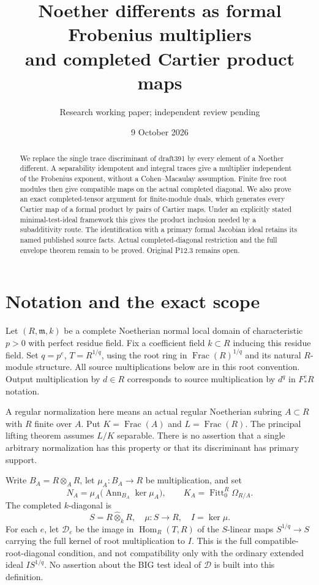 \documentclass[11pt]{article}
\title{Noether differents as formal Frobenius multipliers\\and completed Cartier product maps}
\author{Research working paper; independent review pending}
\date{9 October 2026}
\newcommand{\Hom}{\operatorname{Hom}}
\newcommand{\Ann}{\operatorname{Ann}}
\newcommand{\Frac}{\operatorname{Frac}}
\newcommand{\Fitt}{\operatorname{Fitt}}
\newcommand{\wtensor}{\mathbin{\widehat\otimes}}
\begin{document}
\maketitle
\begin{abstract}
We replace the single trace discriminant of draft391 by every element of
a Noether different. A separability idempotent and integral traces give a
multiplier independent of the Frobenius exponent, without a Cohen--Macaulay
assumption. Finite free root modules then give compatible maps on the actual
completed diagonal. We also prove an exact completed-tensor argument for
finite-module duals, which generates every Cartier map of a formal product
by pairs of Cartier maps. Under an explicitly stated minimal-test-ideal
framework this gives the product inclusion needed by a subadditivity route.
The identification with a primary formal Jacobian ideal retains its named
published source facts. Actual completed-diagonal restriction and the full
envelope theorem remain to be proved. Original P12.3 remains open.
\end{abstract}

\section{Notation and the exact scope}
Let $(R,\mathfrak m,k)$ be a complete Noetherian normal local domain of
characteristic $p>0$ with perfect residue field. Fix a coefficient field
$k\subset R$ inducing this residue field. Set $q=p^e$, $T=R^{1/q}$, using
the root ring in $\Frac(R)^{1/q}$ and its natural $R$-module structure.
All source multiplications below are in this root convention. Output
multiplication by $d\in R$ corresponds to source multiplication by $d^q$
in $F_*^eR$ notation.

A regular normalization here means an actual regular Noetherian subring
$A\subset R$ with $R$ finite over $A$. Put $K=\Frac(A)$ and
$L=\Frac(R)$. The principal lifting theorem assumes $L/K$ separable.
There is no assertion that a single arbitrary normalization has this
property or that its discriminant has primary support.

Write $B_A=R\otimes_A R$, let $\mu_A:B_A\to R$ be multiplication, and set
\[
 N_A=\mu_A\bigl(\Ann_{B_A}\ker\mu_A\bigr),\qquad
 K_A=\Fitt_0^R\Omega_{R/A}.
\]
The completed $k$-diagonal is
\[
 S=R\wtensor_k R,\quad \mu:S\to R,\quad I=\ker\mu.
\]
For each $e$, let $\mathcal D_e$ be the image in $\Hom_R(T,R)$ of the
$S$-linear maps $S^{1/q}\to S$ carrying the full kernel of root
multiplication to $I$. This is the full compatible-root-diagonal condition,
and not compatibility only with the ordinary extended ideal $IS^{1/q}$.
No assertion about the BIG test ideal of $\mathcal D$ is built into this
definition.
\end{document}
